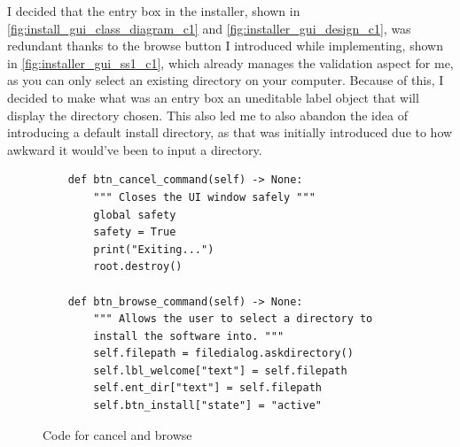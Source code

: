 \documentclass[11pt]{article}
\begin{document}
            I decided that the entry box in the installer, shown in \autoref{fig:install_gui_class_diagram_c1} and \autoref{fig:installer_gui_design_c1}, was redundant thanks to the browse button I introduced while implementing, shown in \autoref{fig:installer_gui_ss1_c1}, which already manages the validation aspect for me, as you can only select an existing directory on your computer. Because of this, I decided to make what was an entry box an uneditable label object that will display the directory chosen. This also led me to also abandon the idea of introducing a default install directory, as that was initially introduced due to how awkward it would've been to input a directory.

            \begin{figure}[!ht]
                \begin{verbatim}
    def btn_cancel_command(self) -> None:
        """ Closes the UI window safely """
        global safety
        safety = True
        print("Exiting...")
        root.destroy()

    def btn_browse_command(self) -> None:
        """ Allows the user to select a directory to 
        install the software into. """
        self.filepath = filedialog.askdirectory()
        self.lbl_welcome["text"] = self.filepath
        self.ent_dir["text"] = self.filepath
        self.btn_install["state"] = "active"
                \end{verbatim}
                \caption{Code for cancel and browse}
                \label{sc:cancel_and_browse_btns_sc_c1}
            \end{figure}
\end{document}
